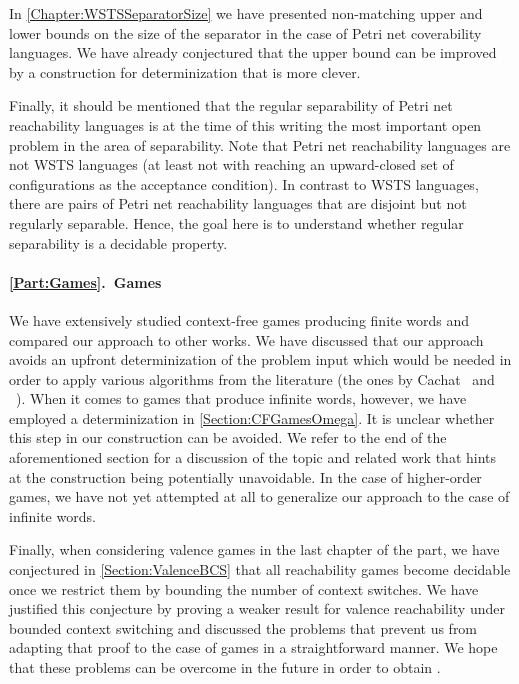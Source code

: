 \documentclass[../../diss.tex]{subfiles}
\begin{document}
In \cref{Chapter:WSTSSeparatorSize} we have presented non-matching upper and lower bounds on the size of the separator in the case of Petri net coverability languages.
We have already conjectured that the upper bound can be improved by a construction for determinization that is more clever.

Finally, it should be mentioned that the regular separability of Petri net reachability languages is at the time of this writing the most important open problem in the area of separability.
Note that Petri net reachability languages are not WSTS languages (at least not with reaching an upward-closed set of configurations as the acceptance condition).
In contrast to WSTS languages, there are pairs of Petri net reachability languages that are disjoint but not regularly separable.
Hence, the goal here is to understand whether regular separability is a decidable property.%

\paragraph{\cref{Part:Games}.~Games}

We have extensively studied context-free games producing finite words and compared our approach to other works.
We have discussed that our approach avoids an upfront determinization of the problem input which would be needed in order to apply various algorithms from the literature (\eg the ones by Cachat~\cite{Cachat02} and \Walu~\cite{Walukiewicz01}).
When it comes to games that produce infinite words, however, we have employed a determinization in \cref{Section:CFGamesOmega}.
It is unclear whether this step in our construction can be avoided.
We refer to the end of the aforementioned section for a discussion of the topic and related work that hints at the construction being potentially unavoidable.
In the case of higher-order games, we have not yet attempted at all to generalize our approach to the case of infinite words.

Finally, when considering valence games in the last chapter of the part, we have conjectured in \cref{Section:ValenceBCS} that all reachability games become decidable once we restrict them by bounding the number of context switches.
We have justified this conjecture by proving a weaker result for valence reachability under bounded context switching and discussed the problems that prevent us from adapting that proof to the case of games in a straightforward manner.
We hope that these problems can be overcome in the future in order to obtain .
\end{document}
